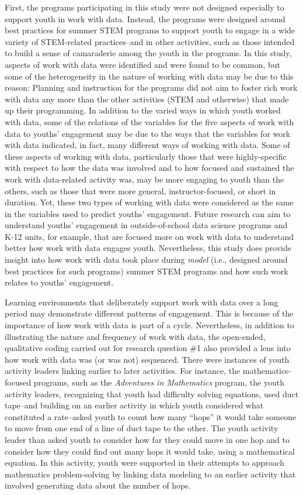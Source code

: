 \documentclass[]{msu-thesis}
\theoremstyle{definition}
\theoremstyle{definition}
\theoremstyle{definition}
\theoremstyle{remark}
\begin{document}
First, the programs participating in this study were not designed
especially to support youth in work with data. Instead, the programs
were designed around best practices for summer STEM programs to support
youth to engage in a wide variety of STEM-related practices--and in
other activities, such as those intended to build a sense of camaraderie
among the youth in the programs. In this study, aspects of work with
data were identified and were found to be common, but some of the
heterogeneity in the nature of working with data may be due to this
reason: Planning and instruction for the programs did not aim to foster
rich work with data any more than the other activities (STEM and
otherwise) that made up their programming. In addition to the varied
ways in which youth worked with data, some of the relations of the
variables for the five aspects of work with data to youths' engagement
may be due to the ways that the variables for work with data indicated,
in fact, many different ways of working with data. Some of these aspects
of working with data, particularly those that were highly-specific with
respect to how the data was involved and to how focused and sustained
the work with data-related activity was, may be more engaging to youth
than the others, such as those that were more general,
instructor-focused, or short in duration. Yet, these two types of
working with data were considered as the same in the variables used to
predict youths' engagement. Future research can aim to understand
youths' engagement in outside-of-school data science programs and K-12
units, for example, that are focused more on work with data to
understand better how work with data engages youth. Nevertheless, this
study does provide insight into how work with data took place during
\emph{model} (i.e., designed around best practices for such programs)
summer STEM programs and how such work relates to youths' engagement.

Learning environments that deliberately support work with data over a
long period may demonstrate different patterns of engagement. This is
because of the importance of how work with data is part of a cycle.
Nevertheless, in addition to illustrating the nature and frequency of
work with data, the open-ended, qualitative coding carried out for
research question \#1 also provided a lens into how work with data was
(or was not) sequenced. There were instances of youth activity leaders
linking earlier to later activities. For instance, the
mathematics-focused programs, such as the \emph{Adventures in
Mathematics} program, the youth activity leaders, recognizing that youth
had difficulty solving equations, used duct tape--and building on an
earlier activity in which youth considered what constituted a
rate--asked youth to count how many ``hops'' it would take someone to
move from one end of a line of duct tape to the other. The youth
activity leader than asked youth to consider how far they could move in
one hop and to consider how they could find out many hops it would take,
using a mathematical equation. In this activity, youth were supported in
their attempts to approach mathematics problem-solving by linking data
modeling to an earlier activity that involved generating data about the
number of hops.
\end{document}
